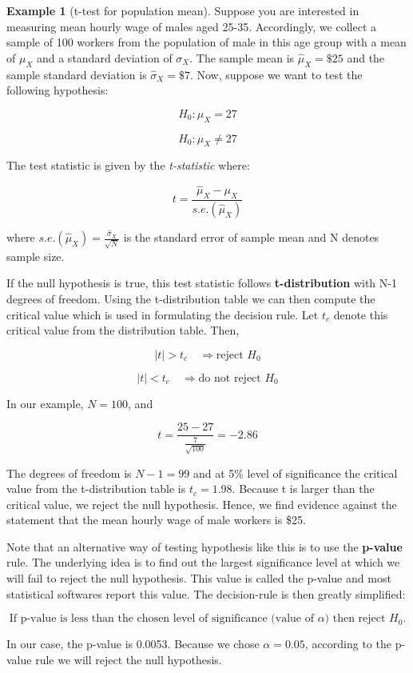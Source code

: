 \documentclass[
]{book}
\theoremstyle{definition}
\theoremstyle{definition}
\newtheorem{example}{Example}[chapter]
\theoremstyle{definition}
\theoremstyle{definition}
\theoremstyle{remark}
\begin{document}
\begin{example}[t-test for population mean]
\protect\hypertarget{exm:unnamed-chunk-93}{}\label{exm:unnamed-chunk-93}Suppose you are interested in measuring mean hourly wage of males aged 25-35. Accordingly, we collect a sample of 100 workers from the population of male in this age group with a mean of \(\mu_X\) and a standard deviation of \(\sigma_X\). The sample mean is \(\hat{\mu}_X=\$25\) and the sample standard deviation is \(\hat{\sigma}_X=\$7\). Now, suppose we want to test the following hypothesis:

\[H_0: \mu_X=27\]

\[H_0: \mu_X \neq 27\]

The test statistic is given by the \emph{t-statistic} where:

\[t=\frac{\hat{\mu}_X-\mu_X}{s.e.(\hat{\mu}_X)} \]

where \(s.e.(\hat{\mu}_X)=\displaystyle \frac{\hat{\sigma}_X}{\sqrt{N}}\) is the standard error of sample mean and N denotes sample size.

If the null hypothesis is true, this test statistic follows \textbf{t-distribution} with N-1 degrees of freedom. Using the t-distribution table we can then compute the critical value which is used in formulating the decision rule. Let \(t_c\) denote this critical value from the distribution table. Then,

\[|t|>t_c \quad \Rightarrow  \text{reject $H_0$} \]

\[|t|<t_c \quad \Rightarrow  \text{do not reject $H_0$} \]

In our example, \(N=100\), and

\[t=\frac{25-27}{\frac{7}{\sqrt{100}}}=-2.86\]

The degrees of freedom is \(N-1=99\) and at 5\% level of significance the critical value from the t-distribution table is \(t_c=1.98\). Because \textbar t\textbar{} is larger than the critical value, we reject the null hypothesis. Hence, we find evidence against the statement that the mean hourly wage of male workers is \$25.

Note that an alternative way of testing hypothesis like this is to use the \textbf{p-value} rule. The underlying idea is to find out the largest significance level at which we will fail to reject the null hypothesis. This value is called the p-value and most statistical softwares report this value. The decision-rule is then greatly simplified:

\[\text{If p-value is less than the chosen level of significance (value of $\alpha$) then reject $H_0$.}\]

In our case, the p-value is 0.0053. Because we chose \(\alpha=0.05\), according to the p-value rule we will reject the null hypothesis.
\end{example}
\end{document}
